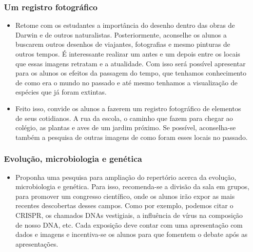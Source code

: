 \documentclass[11pt]{extarticle}
\begin{document}
\subsubsection{Um registro fotográfico}

\begin{itemize} \item Retome com os estudantes a importância do desenho dentro
      das obras de Darwin e de outros naturalistas. Posteriormente, aconselhe
      os alunos a buscarem outros desenhos de viajantes, fotografias e mesmo
      pinturas de outros tempos. É interessante realizar um antes e um depois
      entre os locais que essas imagens retratam e a atualidade. Com isso será
      possível apresentar para os alunos os efeitos da passagem do tempo,
      que tenhamos conhecimento de como era o mundo no passado
      e até mesmo tenhamos a visualização de espécies que já foram
      extintas. 

      \item Feito isso, convide os alunos a fazerem um registro fotográfico
      de elementos de seus cotidianos. A rua da escola, o caminho que fazem
      para chegar ao colégio, as plantas e aves de um jardim próximo. Se
  possível, aconselha-se também a pesquisa de outras imagens de como foram
  esses locais no passado.  \end{itemize}

\subsubsection{Evolução, microbiologia e genética}

\begin{itemize} \item Proponha uma pesquisa para ampliação do repertório acerca
      da evolução, microbiologia e genética. Para isso, recomenda-se a divisão
      da sala em grupos, para promover um congresso científico, onde os alunos
      irão expor as mais recentes descobertas desses campos. Como por exemplo,
      podemos citar o CRISPR, os chamados DNAs vestigiais, a influência de
      vírus na composição de nosso DNA, etc. Cada exposição deve contar com uma
      apresentação com dados e imagens e incentiva-se os alunos para que
  fomentem o debate após as apresentações.  
\end{itemize}
\end{document}
